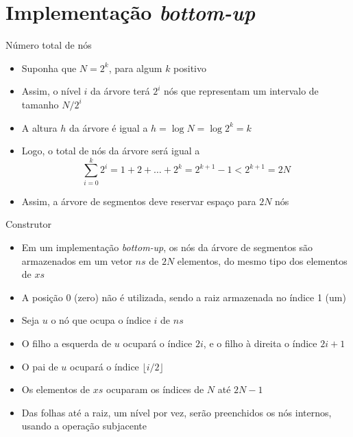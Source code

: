 \section{Implementação {\it bottom-up}}

\begin{frame}[fragile]{Número total de nós}

    \begin{itemize}
        \item Suponha que $N = 2^k$, para algum $k$ positivo

        \item Assim, o nível $i$ da árvore terá $2^i$ nós que representam um intervalo de tamanho
            $N/2^i$

        \item A altura $h$ da árvore é igual a $h = \log N = \log 2^k = k$

        \item Logo, o total de nós da árvore será igual a
        \[
            \sum_{i = 0}^k 2^i = 1 + 2 + \ldots + 2^k = 2^{k + 1} - 1 < 2^{k + 1} = 2N
        \]

        \item Assim, a árvore de segmentos deve reservar espaço para $2N$ nós

    \end{itemize}

\end{frame}

\begin{frame}[fragile]{Construtor}

    \begin{itemize}
        \item Em um implementação \textit{bottom-up}, os nós da árvore de segmentos são armazenados
            em um vetor $ns$ de $2N$ elementos, do mesmo tipo dos elementos de $xs$

        \item A posição 0 (zero) não é utilizada, sendo a raiz armazenada no índice 1 (um)

        \item Seja $u$ o nó que ocupa o índice $i$ de $ns$

        \item O filho a esquerda de $u$ ocupará o índice $2i$, e o filho à direita o índice $2i + 1$

        \item O pai de $u$ ocupará o índice $\lfloor i/2\rfloor$

        \item Os elementos de $xs$ ocuparam os índices de $N$ até $2N - 1$

        \item Das folhas até a raiz, um nível por vez, serão preenchidos os nós internos, usando
            a operação subjacente
    \end{itemize}

\end{frame}

